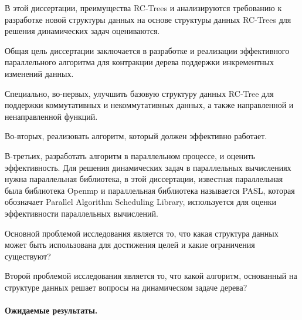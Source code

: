 \documentclass[specification,annotation]{itmo-student-thesis}
\newcommand{\revise}[1]{{\color{red!70!black} #1 }}
\begin{document}
\revise{
В этой диссертации, преимущества RC-Trees и анализируются требованию к разработке новой структуры данных на 
основе структуры данных RC-Trees для решения динамических задач оцениваются.

Общая цель диссертации заключается в разработке и реализации эффективного параллельного алгоритма для 
контракции дерева поддержки инкрементных изменений данных. 

Специально, во-первых, улучшить базовую структуру данных RC-Tree для поддержки коммутативных и некоммутативных 
данных, а также направленной и ненаправленной функций. 

Во-вторых, реализовать алгоритм, который должен эффективно работает. 

В-третьих, разработать алгоритм в параллельном процессе, и оценить эффективность. Для решения динамических 
задач в параллельных вычислениях нужна параллельная библиотека, в этой диссертации, известная параллельная 
была библиотека Openmp и параллельная библиотека называется PASL, которая обозначает Parallel Algorithm 
Scheduling Library, используется для оценки эффективности параллельных вычислений. 

Основной проблемой исследования является то, что какая структура данных может быть использована для достижения 
целей и какие ограничения существуют?

Второй проблемой исследования является то, что какой алгоритм, основанный на структуре данных решает вопросы 
на динамическом задаче дерева?
}

\paragraph{Ожидаемые результаты.}
\end{document}
